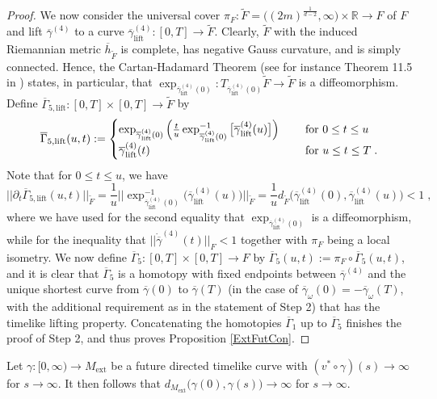 \documentclass[reqno]{article}
\newcommand{\R}{\mathbb{R}}
\newcommand{\Mext}{M_{\mathrm{ext}}}
\newcommand{\ovg}{\overline{\gamma}}
\begin{document}
\begin{proof}
We now consider the universal cover $\pi_F : \tilde{F} = \big((2m)^{\frac{1}{d-2}}, \infty\big) \times \R \to F$  of $F$ and lift $\ovg^{(4)}$ to a curve $\ovg^{(4)}_{\mathrm{lift}} : [0,T] \to \tilde{F}$. Clearly, $\tilde{F}$ with the induced Riemannian metric $\overline{h}_{\tilde{F}}$ is complete, has negative Gauss curvature, and is simply connected.
Hence, the Cartan-Hadamard Theorem (see for instance Theorem 11.5 in \cite{LeeRiem}) states, in particular, that $\exp_{\ovg_{\mathrm{lift}}^{(4)}(0)} : T_{\ovg_{\mathrm{lift}}^{(4)}(0)} \tilde{F} \to \tilde{F}$ is a diffeomorphism. Define $\overline{\Gamma}_{5, \mathrm{lift}} : [0,T] \times [0,T] \to \tilde{F}$ by
\begin{equation*}
\overline{\Gamma}_{5,\mathrm{lift}} (u,t) := \begin{cases} \exp_{\ovg_{\mathrm{lift}}^{(4)}(0)} \Big( \frac{t}{u} \exp^{-1}_{\ovg_{\mathrm{lift}}^{(4)}(0)}\big[\ovg_{\mathrm{lift}}^{(4)} (u) \big]\Big) \quad &\textnormal{ for } 0 \leq t \leq u \\
\ovg_{\mathrm{lift}}^{(4)}(t) &\textnormal{ for } u \leq t \leq T \;.
\end{cases}
\end{equation*}
Note that for $0 \leq t \leq u$, we have
\begin{equation*}
|| \partial_t \overline{\Gamma}_{5, \mathrm{lift}} (u,t) ||_{\tilde{F}} = \frac{1}{u} || \exp^{-1}_{\ovg_{\mathrm{lift}}^{(4)}(0)} \big( \ovg^{(4)}_{\mathrm{lift}}(u)\big)||_{\tilde{F}} = \frac{1}{u} d_{\tilde{F}} \big( \ovg^{(4)}_{\mathrm{lift}}(0), \ovg^{(4)}_{\mathrm{lift}}(u)\big) < 1 \;,
\end{equation*}
where we have used for the second equality that $\exp_{\ovg_{\mathrm{lift}}^{(4)}(0)}$ is a diffeomorphism, while for the inequality that $||\dot{\ovg}^{(4)} (t) ||_F < 1$ together with $\pi_F$ being a local isometry. We now define $\overline{\Gamma}_5 : [0,T] \times [0,T] \to F$ by $\overline{\Gamma}_5(u,t) := \pi_F \circ \overline{\Gamma}_5(u,t)$, and it is clear that $\overline{\Gamma}_5$ is a homotopy with fixed endpoints between $\ovg^{(4)}$ and the unique shortest curve from $\ovg(0)$ to $\ovg(T)$ (in the case of $\ovg_\omega(0) = - \ovg_\omega(T)$, with the additional requirement as in the statement of Step 2) that has the timelike lifting property. Concatenating the homotopies $\overline{\Gamma}_1$ up to $\overline{\Gamma}_5$ finishes the proof of Step 2, and thus proves Proposition \ref{ExtFutCon}.
\end{proof}


\begin{proposition}
\label{LengthToInfty}
Let $\gamma : [0,\infty) \to \Mext$ be a future directed timelike curve with $(v^* \circ \gamma)(s) \to \infty$ for $s \to \infty$. It then follows that $d_{\Mext}\big(\gamma(0), \gamma(s)\big) \to \infty$ for $s \to \infty$.
\end{proposition}
\end{document}
